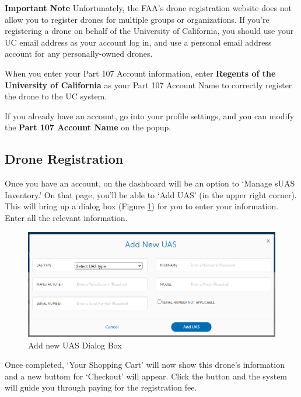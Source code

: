 \documentclass[
  12pt,
]{book}
\newenvironment{notebox}{
  \definecolor{shadecolor}{gray}{.8}  %
  \color{black}
  \begin{shaded}}
 {\end{shaded}}
\begin{document}
\textbf{Important Note} Unfortunately, the FAA's drone registration website does not allow you to register drones for multiple groups or organizations. If you're registering a drone on behalf of the University of California, you should use your UC email address as your account log in, and use a personal email address account for any personally-owned drones.

When you enter your Part 107 Account information, enter \textbf{Regents of the University of California} as your Part 107 Account Name to correctly register the drone to the UC system.

\begin{notebox}
If you already have an account, go into your profile settings, and you can modify the \textbf{Part 107 Account Name} on the popup.

\end{notebox}

\hypertarget{drone-registration}{%
\subsection{Drone Registration}\label{drone-registration}}

Once you have an account, on the dashboard will be an option to `Manage sUAS Inventory.' On that page, you'll be able to `Add UAS' (in the upper right corner). This will bring up a dialog box (Figure \ref{fig:add-UAS}) for you to enter your information. Enter all the relevant information.

\begin{figure}

{\centering \includegraphics[width=0.8\linewidth]{images/Add_new_UAS} 

}

\caption{Add new UAS Dialog Box}\label{fig:add-UAS}
\end{figure}

Once completed, `Your Shopping Cart' will now show this drone's information and a new buttom for `Checkout' will appear. Click the button and the system will guide you through paying for the registration fee.
\end{document}
